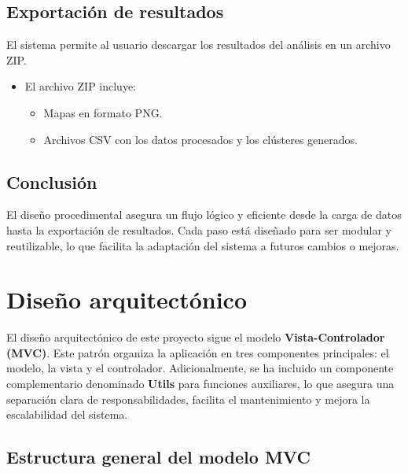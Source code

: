 \subsection{Exportación de resultados}

El sistema permite al usuario descargar los resultados del análisis en un archivo ZIP.

\begin{itemize}
    \item El archivo ZIP incluye:
    \begin{itemize}
        \item Mapas en formato PNG.
        \item Archivos CSV con los datos procesados y los clústeres generados.
    \end{itemize}
\end{itemize}

\subsection{Conclusión}

El diseño procedimental asegura un flujo lógico y eficiente desde la carga de datos hasta la exportación de resultados. Cada paso está diseñado para ser modular y reutilizable, lo que facilita la adaptación del sistema a futuros cambios o mejoras.

\section{Diseño arquitectónico}

El diseño arquitectónico de este proyecto sigue el modelo \textbf{Vista-Controlador (MVC)}. Este patrón organiza la aplicación en tres componentes principales: el modelo, la vista y el controlador. Adicionalmente, se ha incluido un componente complementario denominado \textbf{Utils} para funciones auxiliares, lo que asegura una separación clara de responsabilidades, facilita el mantenimiento y mejora la escalabilidad del sistema.

\subsection{Estructura general del modelo MVC}

